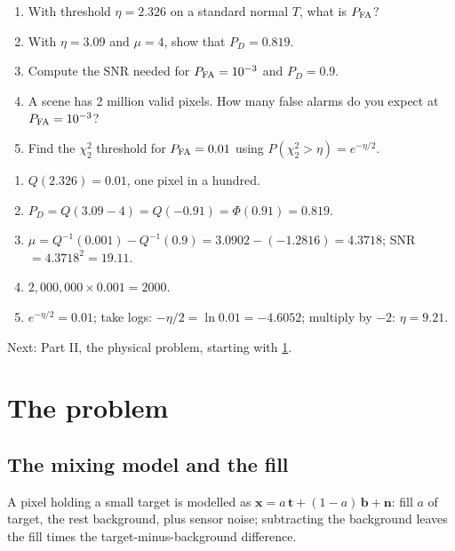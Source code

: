 \documentclass[11pt,a4paper,oneside,openany]{book}
\newcommand{\B}[1]{{\symbf{#1}}}
\newcommand{\B}[1]{{\bm{#1}}}
\newcommand{\vx}{\B{x}}
\newcommand{\vt}{\B{t}}
\newcommand{\vb}{\B{b}}
\newcommand{\vn}{\B{n}}
\newcommand{\nextchapter}[1]{\par\medskip\noindent\hfill\textsf{\small Next: #1}\par}
\begin{document}
\begin{checkyourself}
\begin{enumerate}
\item With threshold $\eta=2.326$ on a standard normal $T$, what is $P_{\rm FA}$?
\item With $\eta=3.09$ and $\mu=4$, show that $P_D=0.819$.
\item Compute the SNR needed for $P_{\rm FA}=10^{-3}$ and $P_D=0.9$.
\item A scene has 2 million valid pixels. How many false alarms do you expect at $P_{\rm FA}=10^{-3}$?
\item Find the $\chi^2_2$ threshold for $P_{\rm FA}=0.01$ using $P(\chi^2_2>\eta)=e^{-\eta/2}$.
\end{enumerate}
\end{checkyourself}

\begin{answers}
\begin{enumerate}
\item $Q(2.326)=0.01$, one pixel in a hundred.
\item $P_D=Q(3.09-4)=Q(-0.91)=\Phi(0.91)=0.819$.
\item $\mu=Q^{-1}(0.001)-Q^{-1}(0.9)=3.0902-(-1.2816)=4.3718$; SNR $=4.3718^2=19.11$.
\item $2{,}000{,}000\times0.001=2000$.
\item $e^{-\eta/2}=0.01$; take logs: $-\eta/2=\ln0.01=-4.6052$; multiply by $-2$: $\eta=9.21$.
\end{enumerate}
\end{answers}

\nextchapter{Part II, the physical problem, starting with \cref{ch:mixing}.}
\part{The problem}
\label{part:problem}

\chapter{The mixing model and the fill}
\label{ch:mixing}

\begin{onething}
A pixel holding a small target is modelled as $\vx=a\,\vt+(1-a)\,\vb+\vn$: fill $a$ of target, the rest background, plus sensor
noise; subtracting the background leaves the fill times the target-minus-background difference.
\end{onething}
\end{document}
